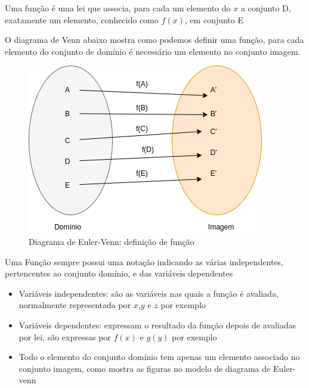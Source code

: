 \begin{multicols*}{2}
    \begin{theorem}
        Uma função é uma lei que associa, para cada um elemento do $x$ a conjunto D, exatamente 				um elemento, conhecido como $f(x)$, em conjunto E
    \end{theorem}
    O diagrama de Venn abaixo mostra como podemos definir uma função, para cada elemento do 				conjunto de domínio é necessário um elemento no conjunto imagem.

    \begin{figure}[H]
        \centering
        \caption{Diagrama de Euler-Venn: definição de função}
        \includegraphics[scale=0.4]{assets/rafael/img.png}
    \end{figure}
    Uma Função sempre possui uma notação indicando as várias independentes, pertencentes ao 				conjunto domínio, e das variáveis dependentes
    \begin{itemize}
        \item Variáveis independentes: são as variáveis nas quais a função é avaliada, 											normalmente representada por $x$,$y$ e $z$ por exemplo
        \item Variáveis dependentes: expressam o resultado da função depois de avaliadas por 							lei, são expressas por $f(x)$ e $g(y)$ por exemplo
        \item Todo o elemento do conjunto domínio tem apenas um elemento associado no conjunto 							imagem, como mostra as figuras no modelo de diagrama de Euler-venn
    \end{itemize}


\end{multicols*}
